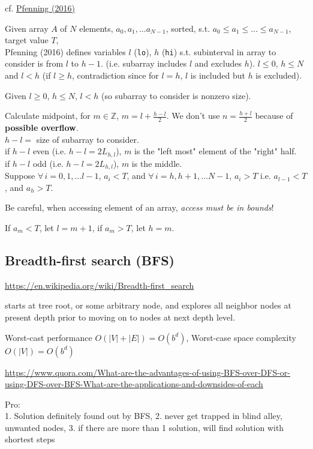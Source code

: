 \documentclass[10pt]{amsart}
\begin{document}
\begin{multicols*}{2}
cf. \href{https://web2.qatar.cmu.edu/~mhhammou/15122-s16/lectures/06-binsearch.pdf}{Pfenning (2016)}

Given array $A$ of $N$ elements, $a_0, a_1, \dots a_{N-1}$, sorted, s.t. $a_0 \leq a_1 \leq \dots \leq a_{N-1}$, target value $T$, \\
Pfenning (2016) defines variables $l$ (\texttt{lo}), $h$ (\texttt{hi}) s.t. subinterval in array to consider is from $l$ to $h-1$. (i.e. subarray includes $l$ and excludes $h$). $l\leq 0 $, $h\leq N$ and $l <h$ (if $l\geq h$, contradiction since for $l=h$, $l$ is included but $h$ is excluded).

Given $l\geq 0$, $h\leq N$, $l<h$ (so subarray to consider is nonzero size).

Calculate midpoint, for $m\in \mathbb{Z}$, $m = l + \frac{h-l}{2}$.  We don't use $n = \frac{h+l}{2}$ because of \textbf{possible overflow}. \\

$h-l =$ size of subarray to consider. \\
if $h-l$ even (i.e. $h-l = 2L_{h,l}$), $m$ is the "left most" element of the "right" half. \\
if $h-l$ odd (i.e. $h-l = 2L_{h,l}$), $m$ is the middle. \\

Suppose $\forall \, i = 0, 1, \dots l -1$, $a_i <T$, and $\forall \, i = h, h+1, \dots N-1$, $a_i >T$ i.e. $a_{l-1} < T$, and $a_h > T$. 

Be careful, when accessing element of an array, \emph{access must be in bounds}!

If $a_m < T$, let $l= m + 1$, if $a_m > T$, let $h=m$.


\subsection{Breadth-first search (BFS)}

\url{https://en.wikipedia.org/wiki/Breadth-first_search}

starts at tree root, or some arbitrary node, and explores all neighbor nodes at present depth prior to moving on to nodes at next depth level.

Worst-cast performance $O(|V|+|E|) = O(b^d)$, Worst-case space complexity $O(|V|) = O(b^d)$

\url{https://www.quora.com/What-are-the-advantages-of-using-BFS-over-DFS-or-using-DFS-over-BFS-What-are-the-applications-and-downsides-of-each}

Pro: \\
1. Solution definitely found out by BFS, 2. never get trapped in blind alley, unwanted nodes, 3. if there are more than 1 solution, will find solution with shortest steps


\end{multicols*}
\end{document}
